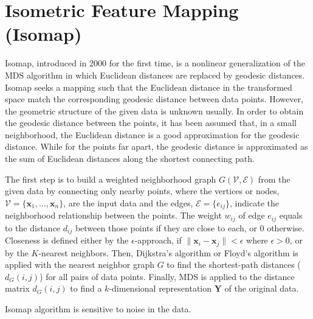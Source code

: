 \section{Isometric Feature Mapping (Isomap)\label{Sec:DR:Isomap}}
Isomap, introduced in 2000 for the first time, is a nonlinear generalization of the MDS algorithm in which Euclidean distances are replaced by geodesic distances.\cite{TenenhaumScience2000} Isomap seeks a mapping such that the Euclidean distance in the transformed space match the corresponding geodesic distance between data points. However, the geometric structure of the given data is unknown usually. In order to obtain the geodesic distance between the points, it has been assumed that, in a small neighborhood, the Euclidean distance is a good approximation for the geodesic distance. While for the points far apart, the geodesic distance is approximated as the sum of Euclidean distances along the shortest connecting path.

The first step is to build a weighted neighborhood graph $G(\mathcal{V},\mathcal{E})$ from the given data by connecting only nearby points, where the vertices or nodes, $\mathcal{V}=\{\mathbf{x}_1,\dots,\mathbf{x}_n\}$, are the input data and the edges, $\mathcal{E}=\{e_{ij}\}$, indicate the neighborhood relationship between the points. The weight $w_{ij}$ of edge $e_{ij}$ equals to the distance $d_{ij}$ between those points if they are close to each, or $0$ otherwise. Closeness is defined either by the $\epsilon$-approach, if $\lVert\mathbf{x}_i-\mathbf{x}_j\rVert<\epsilon$ where $\epsilon >0$, or by the $K$-nearest neighbors. Then, Dijkstra’s algorithm or Floyd's algorithm is applied with the nearest neighbor graph $G$ to find the shortest-path distances ($d_G(i,j)$) for all pairs of data points. Finally, MDS is applied to the distance matrix $d_G(i,j)$ to find a $k$-dimensional representation $\mathbf{Y}$ of the original data.

Isomap algorithm is sensitive to noise in the data.